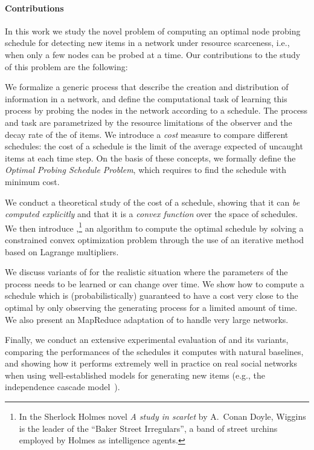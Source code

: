 \paragraph*{Contributions}
In this work we study the novel problem of computing an optimal node probing
schedule for detecting new items in a network under resource scarceness, i.e.,
when only a few nodes can be probed at a time. Our contributions to the study of
this problem are the following:

\begin{itemize*}
	\item We formalize a generic process that describe the creation and
		distribution of information in a network, and define the computational task of
		learning this process by probing the nodes in the network according to a
		schedule. The process and task are parametrized by the resource
		limitations of the observer and the decay rate of the  of
		items. We introduce a \emph{cost} measure to compare different
		schedules: the cost of a schedule is the limit of the average expected
		 of uncaught items at each time step. On the basis of
		these concepts,  we formally define the \emph{Optimal Probing Schedule
		Problem}, which requires to find the schedule with minimum cost.
	\item We conduct a theoretical study of the cost of a schedule, showing that
		it can \emph{be computed explicitly} and that it is a \emph{convex
		function} over the space of schedules. We then introduce
		\algoname,\footnote{In the Sherlock Holmes novel \emph{A study in
		scarlet} by A.~Conan Doyle, Wiggins is the leader of the ``Baker Street
		Irregulars'', a band of street urchins employed by Holmes as
		intelligence agents.} an algorithm to compute the optimal schedule by
		solving a constrained convex optimization problem through the use of an
		iterative method based on Lagrange multipliers.
	\item We discuss variants of \algoname for the realistic situation where
		the parameters of the process needs to be learned or can change over
		time. We show how to compute a schedule which is (probabilistically)
		guaranteed to have a cost very close to the optimal by only observing
		the generating process for a limited amount of time. We also present an
		MapReduce adaptation of \algoname to handle very large networks.
	\item Finally, we conduct an extensive experimental evaluation of \algoname
		and its variants, comparing the performances of the schedules it
		computes with natural baselines, and showing how it performs extremely
		well in practice on real social networks when using well-established
		models for generating new items (e.g., the independence cascade
		model~\citep{Kempe2003}).
\end{itemize*}

